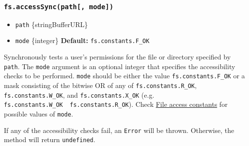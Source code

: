 \subsubsection{\texorpdfstring{\texttt{fs.accessSync(path{[},\ mode{]})}}{fs.accessSync(path{[}, mode{]})}}\label{fs.accesssyncpath-mode}

\begin{itemize}
\tightlist
\item
  \texttt{path} \{string\textbar Buffer\textbar URL\}
\item
  \texttt{mode} \{integer\} \textbf{Default:}
  \texttt{fs.constants.F\_OK}
\end{itemize}

Synchronously tests a user's permissions for the file or directory
specified by \texttt{path}. The \texttt{mode} argument is an optional
integer that specifies the accessibility checks to be performed.
\texttt{mode} should be either the value \texttt{fs.constants.F\_OK} or
a mask consisting of the bitwise OR of any of
\texttt{fs.constants.R\_OK}, \texttt{fs.constants.W\_OK}, and
\texttt{fs.constants.X\_OK} (e.g.
\texttt{fs.constants.W\_OK\ \textbar{}\ fs.constants.R\_OK}). Check
\hyperref[file-access-constants]{File access constants} for possible
values of \texttt{mode}.

If any of the accessibility checks fail, an \texttt{Error} will be
thrown. Otherwise, the method will return \texttt{undefined}.

\begin{Shaded}
\begin{Highlighting}[]
\OperatorTok{,} \OperatorTok{;}

\NormalTok{ \{}
  \NormalTok{(}\OperatorTok{,} \OperatorTok{|}\NormalTok{)}\OperatorTok{;}
  \NormalTok{(}\NormalTok{)}\OperatorTok{;}
\NormalTok{\} }
  \NormalTok{(}\NormalTok{)}\OperatorTok{;}
\NormalTok{\}}
\end{Highlighting}
\end{Shaded}

